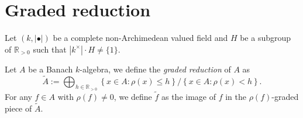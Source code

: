 \iffalse
It is not immediately clear that $A_V$ is canonically assocaited with $V$. We will prove this now.

\begin{proposition}
    Let $A$ be a $k_H$-affinoid algebra and $V$ be an affinoid domain in $X$ represented by $\varphi:A\rightarrow A_V$. Then $\Sp \varphi:\Sp A_V\rightarrow \Sp A$ induces a homeomorphism $\Sp A_V\rightarrow V$.

    In particular, $A_V$ is uniquely determined by $V$ up to isomorphisms of Banach $k$-algebras.
\end{proposition}
\begin{proof}
    Let us reduce the problem to the case where $k$ is non-trivially valued and $A$ and $A_V$ are both strictly $k$-affinoid. 
    
    By \cref{prop-redtostrictlykaff}, taking a suitable $r=r(r_1,\ldots,r_n)\in \mathbb{R}^n_{>0}$ such that $r_1,\ldots,r_n$ are linearly independent in the $\mathbb{Q}$-linear space $\mathbb{R}_{>0}/\sqrt{|k^{\times}|}$, we may guarantee that $A\hat{\otimes}_k k_r$ and $A_V\hat{\otimes}_k k_r$ are both strictly $k_r$-affinoid.

    Let $V'$ be the inverse image of $V$ in $\Sp A\hat{\otimes}_k k_r$. We claim that $V'$ is a strict $k_r$-affinoid domain in $\Sp A\hat{\otimes}_k k_r$ represented by $A\hat{\otimes}_k k_r\rightarrow A_V\hat{\otimes}_k k_r$.
\end{proof}
\fi

\section{Graded reduction}
Let $(k,|\bullet|)$ be a complete non-Archimedean valued field and $H$ be a subgroup of $\mathbb{R}_{>0}$ such that $|k^{\times}|\cdot H\neq \{1\}$.

\begin{definition}\label{def-gradedredu}
    Let $A$ be a Banach $k$-algebra, we define the \emph{graded reduction} of $A$ as
    \[
        \tilde{A}:=\bigoplus_{h\in \mathbb{R}_{>0}}  \left\{x\in A:\rho(x)\leq  h\right\}/\left\{x\in A:\rho(x)<  h\right\}.  
    \]
    For any $f\in A$ with $\rho(f)\neq 0$, we define $\tilde{f}$ as the image of $f$ in the $\rho(f)$-graded piece of $\tilde{A}$.
\end{definition}



